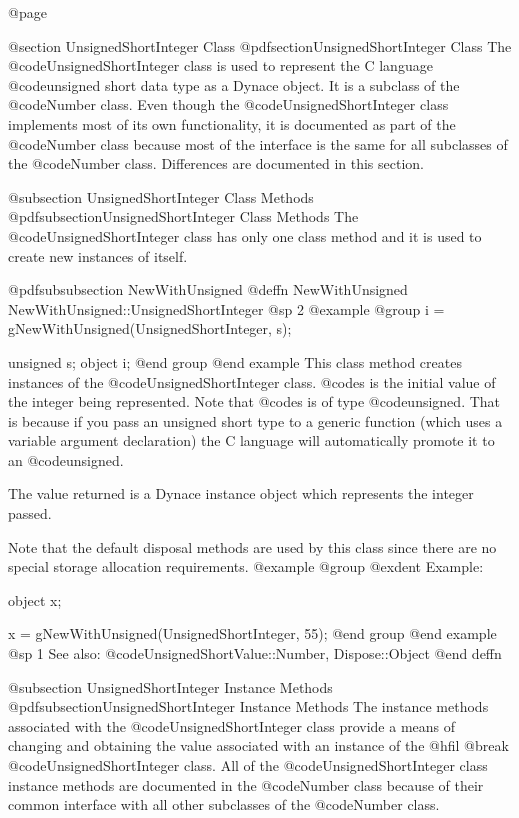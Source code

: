 @page

@section UnsignedShortInteger Class
@pdfsection{UnsignedShortInteger Class}
The @code{UnsignedShortInteger} class is used to represent the C language
@code{unsigned short} data type as a Dynace object.  It is a subclass of the
@code{Number} class.  Even though the @code{UnsignedShortInteger} class
implements most of its own functionality, it is documented as part of
the @code{Number} class because most of the interface is the same for
all subclasses of the @code{Number} class.  Differences are documented
in this section.


@subsection UnsignedShortInteger Class Methods
@pdfsubsection{UnsignedShortInteger Class Methods}
The @code{UnsignedShortInteger} class has only one class method and it
is used to create new instances of itself.



@pdfsubsubsection {NewWithUnsigned}
@deffn {NewWithUnsigned} NewWithUnsigned::UnsignedShortInteger
@sp 2
@example
@group
i = gNewWithUnsigned(UnsignedShortInteger, s);

unsigned s;
object  i;
@end group
@end example
This class method creates instances of the @code{UnsignedShortInteger}
class.  @code{s} is the initial value of the integer being represented.
Note that @code{s} is of type @code{unsigned}.  That is because if you
pass an unsigned short type to a generic function (which uses a variable
argument declaration) the C language will automatically promote it to an
@code{unsigned}.

The value returned is a Dynace instance object which represents the
integer passed.

Note that the default disposal methods are used by this class since
there are no special storage allocation requirements.
@example
@group
@exdent Example:

object  x;

x = gNewWithUnsigned(UnsignedShortInteger, 55);
@end group
@end example
@sp 1
See also:  @code{UnsignedShortValue::Number, Dispose::Object}
@end deffn





@subsection UnsignedShortInteger Instance Methods
@pdfsubsection{UnsignedShortInteger Instance Methods}
The instance methods associated with the @code{UnsignedShortInteger}
class provide a means of changing and obtaining the value associated
with an instance of the @hfil @break @code{UnsignedShortInteger} class.
All of the @code{UnsignedShortInteger} class instance methods are
documented in the @code{Number} class because of their common interface
with all other subclasses of the @code{Number} class.

















